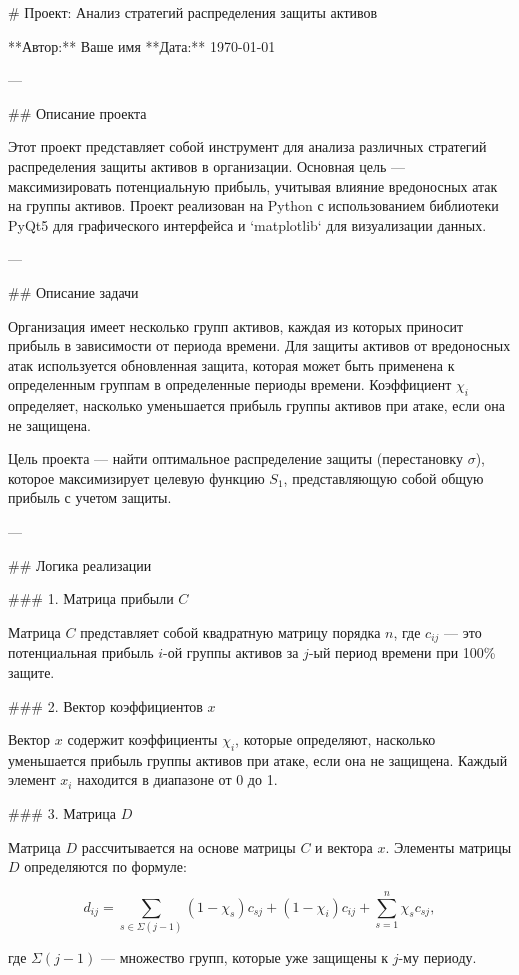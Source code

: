 # Проект: Анализ стратегий распределения защиты активов

**Автор:** Ваше имя  
**Дата:** \today

---

## Описание проекта

Этот проект представляет собой инструмент для анализа различных стратегий распределения защиты активов в организации. Основная цель — максимизировать потенциальную прибыль, учитывая влияние вредоносных атак на группы активов. Проект реализован на Python с использованием библиотеки PyQt5 для графического интерфейса и `matplotlib` для визуализации данных.

---

## Описание задачи

Организация имеет несколько групп активов, каждая из которых приносит прибыль в зависимости от периода времени. Для защиты активов от вредоносных атак используется обновленная защита, которая может быть применена к определенным группам в определенные периоды времени. Коэффициент \( \chi_i \) определяет, насколько уменьшается прибыль группы активов при атаке, если она не защищена.

Цель проекта — найти оптимальное распределение защиты (перестановку \( \sigma \)), которое максимизирует целевую функцию \( S_1 \), представляющую собой общую прибыль с учетом защиты.

---

## Логика реализации

### 1. Матрица прибыли \( C \)

Матрица \( C \) представляет собой квадратную матрицу порядка \( n \), где \( c_{ij} \) — это потенциальная прибыль \( i \)-ой группы активов за \( j \)-ый период времени при 100\% защите.

### 2. Вектор коэффициентов \( x \)

Вектор \( x \) содержит коэффициенты \( \chi_i \), которые определяют, насколько уменьшается прибыль группы активов при атаке, если она не защищена. Каждый элемент \( x_i \) находится в диапазоне от 0 до 1.

### 3. Матрица \( D \)

Матрица \( D \) рассчитывается на основе матрицы \( C \) и вектора \( x \). Элементы матрицы \( D \) определяются по формуле:

$$
d_{ij} = \sum_{s \in \Sigma(j-1)} (1 - \chi_s)c_{sj} + (1 - \chi_i)c_{ij} + \sum_{s=1}^n \chi_s c_{sj},
$$

где \( \Sigma(j-1) \) — множество групп, которые уже защищены к \( j \)-му периоду.

